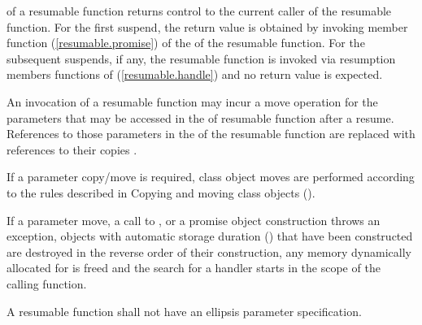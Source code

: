 \pnum 
{} of a resumable function returns control to the current
caller of the resumable function. For the first suspend, the return value is obtained by invoking member function 
 (\ref{resumable.promise})
of the  of the resumable function.
For the subsequent suspends, if any, the resumable function
is invoked via resumption members functions of
 (\ref{resumable.handle}) and no return value is expected.

\pnum
An invocation of a resumable function may incur a move operation for the parameters that may be accessed in the 
of resumable function after a resume. 
References to those parameters in the 
of the resumable function are replaced with 
references to their copies .

\pnum
If a parameter copy/move is required, class object moves are performed according to the rules described in Copying and moving class objects ().

\pnum
If a parameter move, a call to , or a promise object construction throws
an exception, objects with automatic storage duration () that have been
constructed are destroyed in the reverse order of their construction, any memory dynamically allocated 
for  is freed
and the search for a handler starts in the scope of the calling function. 

\pnum
A resumable function shall not have an ellipsis parameter specification. 


%
